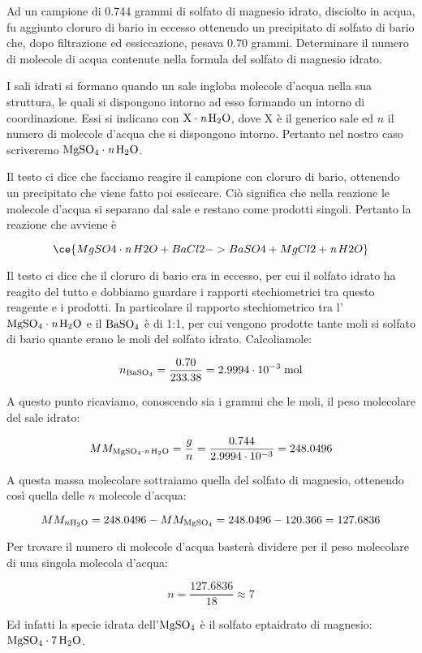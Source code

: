 \begin{esercizio}
    Ad un campione di 0.744 grammi di solfato di magnesio idrato, disciolto in acqua, fu aggiunto cloruro di bario in eccesso ottenendo un precipitato di solfato di bario che, dopo filtrazione ed essiccazione, pesava 0.70 grammi. Determinare il numero di molecole di acqua contenute nella formula del solfato di magnesio idrato.
\end{esercizio}
\begin{soluzione}
    I sali idrati si formano quando un sale ingloba molecole d'acqua nella sua struttura, le quali si dispongono intorno ad esso formando un intorno di coordinazione. Essi si indicano con $\rm X \cdot \textit{n}\,H_2O$, dove X è il generico sale ed $n$ il numero di molecole d'acqua che si dispongono intorno. Pertanto nel nostro caso scriveremo $\rm MgSO_4 \cdot \textit{n}\,H_2O$.

Il testo ci dice che facciamo reagire il campione con cloruro di bario, ottenendo un precipitato che viene fatto poi essiccare. Ciò significa che nella reazione le molecole d'acqua si separano dal sale e restano come prodotti singoli. Pertanto la reazione che avviene è

$$\ce{MgSO4 \cdot \textit{n}\,H2O + BaCl2 -> BaSO4 + MgCl2 + \textit{n}\,H2O}$$

Il testo ci dice che il cloruro di bario era in eccesso, per cui il solfato idrato ha reagito del tutto e dobbiamo guardare i rapporti stechiometrici tra questo reagente e i prodotti. In particolare il rapporto stechiometrico tra l'$\rm MgSO_4 \cdot \textit{n}\,H_2O$ e il $\rm BaSO_4$ è di 1:1, per cui vengono prodotte tante moli si solfato di bario quante erano le moli del solfato idrato. Calcoliamole:

$$n_{\rm BaSO_4}=\frac{0.70}{233.38}
=2.9994 \cdot 10^{-3} \; \rm mol$$

A questo punto ricaviamo, conoscendo sia i grammi che le moli, il peso molecolare del sale idrato:

$$MM_{\rm MgSO_4 \cdot \textit{n}\,H_2O}
=\frac{g}{n}
=\frac{0.744}{2.9994 \cdot 10^{-3}}=248.0496$$

A questa massa molecolare sottraiamo quella del solfato di magnesio, ottenendo così quella delle $n$ molecole d'acqua:

$$MM_{n \rm H_2O}=248.0496 - MM_{\rm MgSO_4}
=248.0496 - 120.366=127.6836$$

Per trovare il numero di molecole d'acqua basterà dividere per il peso molecolare di una singola molecola d'acqua:

$$n=\frac{127.6836}{18} \approx 7$$

Ed infatti la specie idrata dell'$\rm MgSO_4$ è il solfato eptaidrato di magnesio: $\rm MgSO_4 \cdot 7\,H_2O$.

\end{soluzione}


